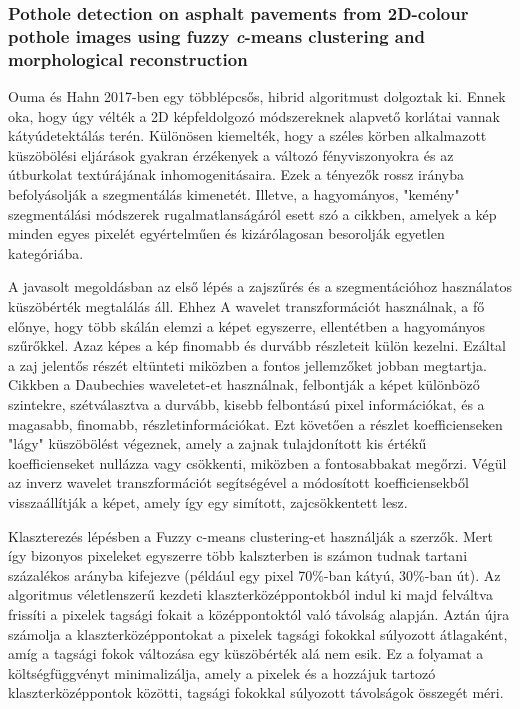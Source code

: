 \subsubsection{\texorpdfstring{Pothole detection on asphalt pavements from
		2D-colour pothole images using fuzzy \emph{c}-means clustering and
		morphological
		reconstruction}{Pothole detection on asphalt pavements from 2D-colour pothole images using fuzzy c-means clustering and morphological reconstruction}}

Ouma és Hahn 2017-ben egy többlépcsős, hibrid algoritmust dolgoztak ki.
Ennek oka, hogy úgy vélték a 2D képfeldolgozó módszereknek alapvető
korlátai vannak kátyúdetektálás terén. Különösen kiemelték, hogy a
széles körben alkalmazott küszöbölési eljárások gyakran érzékenyek a
változó fényviszonyokra és az útburkolat textúrájának inhomogenitásaira.
Ezek a tényezők rossz irányba befolyásolják a szegmentálás kimenetét.
Illetve, a hagyományos, "kemény" szegmentálási módszerek
rugalmatlanságáról esett szó a cikkben, amelyek a kép minden egyes
pixelét egyértelműen és kizárólagosan besorolják egyetlen kategóriába.

A javasolt megoldásban az első lépés a zajszűrés és a szegmentációhoz
használatos küszöbérték megtalálás áll. Ehhez A wavelet transzformációt
használnak, a fő előnye, hogy több skálán elemzi a képet egyszerre,
ellentétben a hagyományos szűrőkkel. Azaz képes a kép finomabb és
durvább részleteit külön kezelni. Ezáltal a zaj jelentős részét
eltünteti miközben a fontos jellemzőket jobban megtartja. Cikkben a
Daubechies waveletet-et használnak, felbontják a képet különböző
szintekre, szétválasztva a durvább, kisebb felbontású pixel
információkat, és a magasabb, finomabb, részletinformációkat. Ezt
követően a részlet koefficienseken "lágy" küszöbölést végeznek, amely a
zajnak tulajdonított kis értékű koefficienseket nullázza vagy csökkenti,
miközben a fontosabbakat megőrzi. Végül az inverz wavelet
transzformációt segítségével a módosított koefficiensekből
visszaállítják a képet, amely így egy simított, zajcsökkentett lesz.

Klaszterezés lépésben a Fuzzy c-means clustering-et használják a
szerzők. Mert így bizonyos pixeleket egyszerre több kalszterben is
számon tudnak tartani százalékos arányba kifejezve (például egy pixel
70\%-ban kátyú, 30\%-ban út). Az algoritmus véletlenszerű kezdeti
klaszterközéppontokból indul ki majd felváltva frissíti a pixelek
tagsági fokait a középpontoktól való távolság alapján. Aztán újra
számolja a klaszterközéppontokat a pixelek tagsági fokokkal súlyozott
átlagaként, amíg a tagsági fokok változása egy küszöbérték alá nem esik.
Ez a folyamat a költségfüggvényt minimalizálja, amely a pixelek és a
hozzájuk tartozó klaszterközéppontok közötti, tagsági fokokkal súlyozott
távolságok összegét méri.

